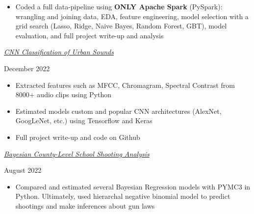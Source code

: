 \documentclass[
  16,
]{article}
\providecommand{\tightlist}{%
  \setlength{\itemsep}{0pt}\setlength{\parskip}{0pt}}\usepackage{longtable,booktabs,array}
\begin{document}
\begin{itemize}
\tightlist
\item
  Coded a full data-pipeline using \textbf{ONLY Apache Spark} (PySpark):
  wrangling and joining data, EDA, feature engineering, model selection
  with a grid search (Lasso, Ridge, Naive Bayes, Random Forest, GBT),
  model evaluation, and full project write-up and analysis
\end{itemize}

\vspace{7pt}

\begin{large}
  \begin{multicols}{2}
    \begin{flushleft}\textit{\href{https://github.com/acbass49/urban_audio_classification}{CNN Classification of Urban Sounds}}\end{flushleft}
    \begin{flushright}December 2022\end{flushright}
  \end{multicols}
  \vspace{-0.17cm}
\end{large}

\begin{itemize}
\tightlist
\item
  Extracted features such as MFCC, Chromagram, Spectral Contrast from
  8000+ audio clips using Python
\item
  Estimated models custom and popular CNN architectures (AlexNet,
  GoogLeNet, etc.) using Tensorflow and Keras
\item
  Full project write-up and code on Github
\end{itemize}

\vspace{7pt}

\begin{large}
  \begin{multicols}{2}
    \begin{flushleft}\textit{\href{https://alexbass.me/posts/bayesian_county/}{Bayesian County-Level School Shooting Analysis}}\end{flushleft}
    \begin{flushright}August 2022\end{flushright}
  \end{multicols}
  \vspace{-0.17cm}
\end{large}

\begin{itemize}
\tightlist
\item
  Compared and estimated several Bayesian Regression models with PYMC3
  in Python. Ultimately, used hierarchal negative binomial model to
  predict shootings and make inferences about gun laws
\end{itemize}
\end{document}
